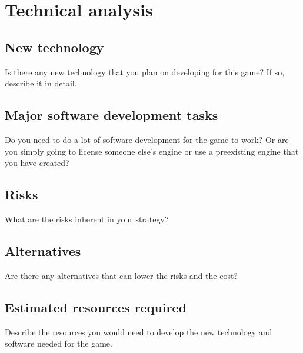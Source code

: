 \section{Technical analysis} %
\subsection{New technology} %
Is there any new technology that you plan on developing for this game? If so, describe it in detail.

\subsection{Major software development tasks} %
Do you need to do a lot of software development for the game to work? Or are you simply going to license someone else's engine or use a preexisting engine that you have created?

\subsection{Risks} %
What are the risks inherent in your strategy?

\subsection{Alternatives} %
Are there any alternatives that can lower the risks and the cost?

\subsection{Estimated resources required} %
Describe the resources you would need to develop the new technology and software needed for the game.